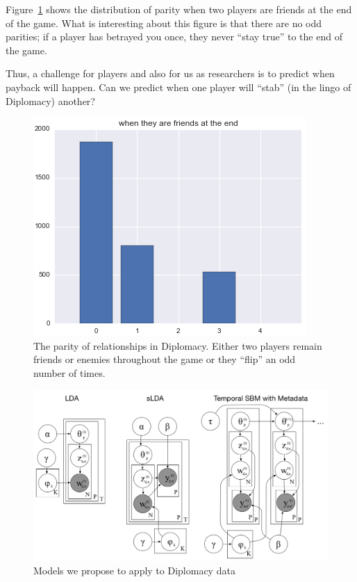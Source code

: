 \documentclass[11pt,letterpaper]{article}
\begin{document}
Figure~\ref{fig:parity} shows the distribution of parity when two
players are friends at the end of the game.  What is interesting about
this figure is that there are no odd parities; if a player has
betrayed you once, they never ``stay true'' to the end of the game.

Thus, a challenge for players and also for us as researchers is to
predict when payback will happen.  Can we predict when one player will
``stab'' (in the lingo of Diplomacy) another?

\begin{figure}[tbh]
  \begin{center}
    \includegraphics[width=0.9\linewidth]{figures/flip_distribution_split}
    \caption{The parity of relationships in Diplomacy.  Either two
      players remain friends or enemies throughout the game or they
      ``flip'' an odd number of times.}
    \label{fig:parity}
  \end{center}
\end{figure}

\begin{figure}
  \includegraphics[width=0.9\linewidth]{figures/graphical_model}
  \caption{Models we propose to apply to Diplomacy data}
\end{figure}
\end{document}
